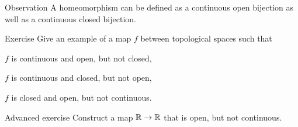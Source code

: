 \begin{thm}{Observation}\label{ex:bijective-closed-open}
A homeomorphism can be defined as a continuous open bijection as well as a continuous closed bijection.
\end{thm}


\begin{thm}{Exercise}\label{ex:closed-open-cont}
Give an example of a map $f$ between topological spaces such that
\begin{subthm}{}
$f$ is continuous and open, but not closed,
\end{subthm}

\begin{subthm}{}
$f$ is continuous and closed, but not open,
\end{subthm}

\begin{subthm}{}
$f$ is closed and open, but not continuous.
\end{subthm}

\end{thm}

\begin{thm}{Advanced exercise}\label{ex:closed-open-cont-R}
Construct a map $\mathbb{R}\to\mathbb{R}$ that is open, but not continuous.
\end{thm}


